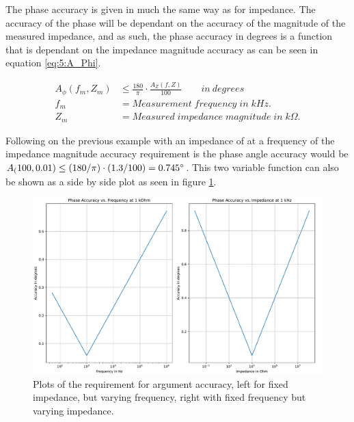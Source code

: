 The phase accuracy is given in much the same way as for impedance. The accuracy of the phase will be dependant on the accuracy of the magnitude of the measured impedance, and as such, the phase accuracy in degrees is a function that is dependant on the impedance magnitude accuracy as can be seen in equation \ref{eq:5:A_Phi}.

\begin{equation}
  \begin{split}
    \label{eq:5:A_Phi}
    A_\phi(f_m, Z_m) & \leq \frac{180}{\pi} \cdot \frac{A_Z(f,Z)}{100} \qquad in \:degrees\\
    f_m & = Measurement \; frequency \; in \; kHz. \\
    Z_m &= Measured \; impedance \; magnitude \; in \; k\Omega.
  \end{split}
\end{equation}

Following on the previous example with an impedance of  at a frequency of  the impedance magnitude accuracy requirement is  the phase
angle accuracy would be $A_(100,0.01) \leq (180/\pi)\cdot(1.3/100) = \SI{0.745}{\degree}$. This two variable function can also be shown as a side by side plot as seen in figure \ref{fig_5_PhaseAccuracy}.

\begin{figure}[H]
  \centering
  \includegraphics[width=1\textwidth]{Sections/5_SystemRequirements/Figures/PhaseSpec.pdf}
  \caption{Plots of the requirement for argument accuracy, left for fixed impedance, but varying frequency, right with fixed frequency but varying impedance.}
  \label{fig_5_PhaseAccuracy}
\end{figure}